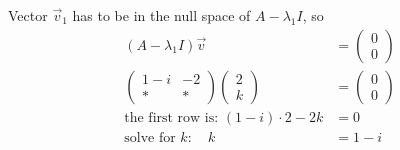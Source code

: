 \begin{parts}
{        Vector $\vec v_1$ has to be in the null space of $A - \lambda_1 I$, so \begin{align}
            (A - \lambda_1 I) \vec v & = \begin{pmatrix} 0\\0 \end{pmatrix} \\
            \begin{pmatrix} 1-i & -2 \\ \ast & \ast \end{pmatrix}\begin{pmatrix} 2 \\ k \end{pmatrix}& = \begin{pmatrix} 0\\0 \end{pmatrix} \\ \text{the first row is: } (1-i)\cdot 2 - 2k &= 0 \\
            \text{solve for } k: \quad k &= 1 - i
        \end{align}
        
}
\end{parts}
